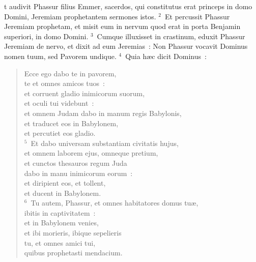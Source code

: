 \bchapter
{}t audivit Phassur filius Emmer, sacerdos, qui constitutus erat princeps in domo Domini, Jeremiam prophetantem sermones istos.
${}^{2}$~Et percussit Phassur Jeremiam prophetam, et misit eum in nervum quod erat in porta Benjamin superiori, in domo Domini.
${}^{3}$~Cumque illuxisset in crastinum, eduxit Phassur Jeremiam de nervo, et dixit ad eum Jeremias~: Non Phassur vocavit Dominus nomen tuum, sed Pavorem undique.
${}^{4}$~Quia h\ae c dicit Dominus~: \begin{verse}Ecce ego dabo te in pavorem,\\ te et omnes amicos tuos~:\\ et corruent gladio inimicorum suorum,\\ et oculi tui videbunt~:\\ et omnem Judam dabo in manum regis Babylonis,\\ et traducet eos in Babylonem,\\ et percutiet eos gladio.\\
${}^{5}$~Et dabo universam substantiam civitatis hujus,\\ et omnem laborem ejus, omneque pretium,\\ et cunctos thesauros regum Juda\\ dabo in manu inimicorum eorum~:\\ et diripient eos, et tollent,\\ et ducent in Babylonem.\\
${}^{6}$~Tu autem, Phassur, et omnes habitatores domus tu\ae ,\\ ibitis in captivitatem~:\\ et in Babylonem venies,\\ et ibi morieris, ibique sepelieris\\ tu, et omnes amici tui,\\ quibus prophetasti mendacium.\end{verse}



